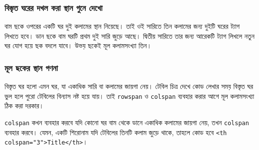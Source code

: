 \par\noindent\begin{minipage}{\linewidth}
\subsubsection{বিস্তৃত ঘরের দখল করা স্থান গুনে দেখো}
\begin{center}
\end{center}
বাম ছকে ওপরের একটি ঘর দুই কলামের স্থান নিয়েছে। তাই ওই সারিতে তিন কলামের জন্য দুইটি ঘরের ট্যাগ লিখতে হবে। ডান ছকে বাম ঘরটি প্রথম দুই সারি জুড়ে আছে। দ্বিতীয় সারিতে তার জন্য আরেকটি ট্যাগ লিখলে নতুন ঘর যোগ হয়ে ছক বদলে যাবে। উভয় ছকেই মূল কলামসংখ্যা তিন।

\end{minipage}\par\smallskip

\subsubsection{মূল ছকের স্থান গণনা}

বিস্তৃত ঘর হলো এমন ঘর, যা একাধিক সারি বা কলামের জায়গা নেয়। টেবিল চিত্র দেখে কোড লেখার সময় বিস্তৃত ঘর ভুল হলে পুরো টেবিলের বিন্যাস নষ্ট হয়ে যায়। তাই \texttt{rowspan} ও \texttt{colspan} ব্যবহার করার আগে মূল কলামসংখ্যা ঠিক করা দরকার।

\begin{boardbox}{\texttt{colspan} কখন ব্যবহার করবে}
যদি কোনো ঘর বাম থেকে ডানে একাধিক কলামের জায়গা নেয়, তখন \texttt{colspan} ব্যবহার করবে। যেমন, একটি শিরোনাম যদি টেবিলের তিনটি কলাম জুড়ে থাকে, তাহলে কোড হবে \texttt{<th colspan="3">Title</th>}।
\end{boardbox}


